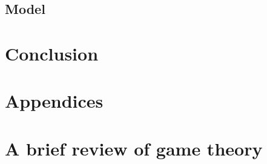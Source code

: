 \documentclass{article}
\begin{document}



\subsection{Model}\label{model_proposal:proposal}





\section{Conclusion}

\appendix
{}
\section*{Appendices}
\section{A brief review of game theory}\label{appendix-game-theory}


\end{document}
